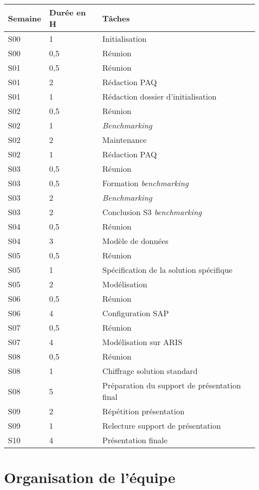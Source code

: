 \documentclass[twoside]{article}
\begin{document}
\begin{longtable}{|l|l|l|}
\endhead \hline
Semaine&Durée en H&Tâches\\
\hline
S00&1&Initialisation\\
\hline
S00&0,5&Réunion\\
\hline
S01&0,5&Réunion\\
\hline
S01&2&Rédaction PAQ\\
\hline
S01&1&Rédaction dossier d'initialisation\\
\hline
S02&0,5&Réunion\\
\hline
S02&1&\textsl{Benchmarking}\\
\hline
S02&2&Maintenance\\
\hline
S02&1&Rédaction PAQ\\
\hline
S03&0,5&Réunion\\
\hline
S03&0,5&Formation \textsl{benchmarking}\\
\hline
S03&2&\textsl{Benchmarking}\\
\hline
S03&2&Conclusion S3 \textsl{benchmarking}\\
\hline
S04&0,5&Réunion\\
\hline
S04&3&Modèle de données\\
\hline
S05&0,5&Réunion\\
\hline
S05&1&Spécification de la solution spécifique\\
\hline
S05&2&Modélisation\\
\hline
S06&0,5&Réunion\\
\hline
S06&4&Configuration SAP\\
\hline
S07&0,5&Réunion\\
\hline
S07&4&Modélisation sur ARIS\\
\hline
S08&0,5&Réunion\\
\hline
S08&1&Chiffrage solution standard\\
\hline
S08&5&Préparation du support de présentation final\\
\hline
S09&2&Répétition présentation\\
\hline
S09&1&Relecture support de présentation\\
\hline
S10&4&Présentation finale\\
\hline
\end{longtable}

\pagebreak



\section{Organisation de l'équipe}
\end{document}
